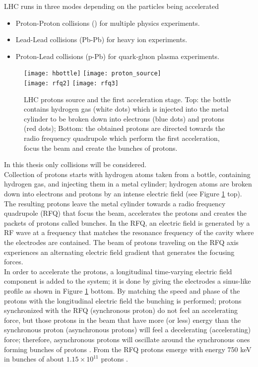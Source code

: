 \noindent LHC runs in three modes depending on the particles being accelerated

\begin{itemize}
\item Proton-Proton collisions (\pp) for multiple physics experiments.
\item Lead-Lead collisions (Pb-Pb) for heavy ion experiments. 
\item Proton-Lead collisions (p-Pb) for quark-gluon plasma experiments.
\end{itemize}

\begin{figure}[!h]
\centering
\texttt{[image: hbottle]}
\texttt{[image: proton\_source]}\\
\texttt{[image: rfq2]}
\texttt{[image: rfq3]}
\caption[LHC protons source. First acceleration stage.]{LHC protons source and the first acceleration stage. Top: the bottle contains hydrogen gas (white dots) which is injected into the metal cylinder to be broken down into electrons (blue dots) and protons (red dots); Bottom: the obtained protons are directed towards the radio frequency quadrupole which perform the first acceleration, focus the beam and create the bunches of protons. \cite{rfq2,video}}\label{fig:hbottle}
\end{figure}

\noindent In this thesis only \pp collisions will be considered.\\

\noindent Collection of protons starts with hydrogen atoms taken from a bottle, containing hydrogen gas, and injecting them in a metal cylinder; hydrogen atoms are broken down into electrons and protons by an intense electric field (see Figure \ref{fig:hbottle} top). The resulting protons leave the metal cylinder towards a radio frequency quadrupole (RFQ) that focus the beam, accelerates the protons and creates the packets of protons called bunches. In the RFQ, an electric field is generated by a RF wave at a frequency that matches the resonance frequency of the cavity where the electrodes are contained. The beam of protons traveling on the RFQ axis experiences an alternating electric field gradient that generates the focusing forces.\\

\noindent In order to accelerate the protons, a longitudinal time-varying electric field component is added to the system; it is done by giving the electrodes a sinus-like profile as shown in Figure \ref{fig:hbottle} bottom. By matching the speed and phase of the protons with the longitudinal electric field the bunching is performed; protons synchronized with the RFQ (synchronous proton) do not feel an accelerating force, but those protons in the beam that have more (or less) energy than the synchronous proton (asynchronous protons) will feel a decelerating (accelerating) force; therefore, asynchronous protons will oscillate around the synchronous ones forming bunches of protons \cite{rfq}. From the RFQ protons emerge with energy 750 keV in bunches of about $1.15 \times 10^{11}$ protons \cite{lyndon}.        

